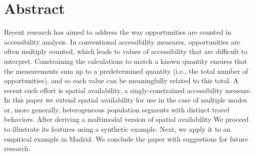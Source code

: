 \documentclass[10pt,letterpaper]{article}
\newcommand{\getIndex}[2]{
  \ForEach{,}{\IfEq{#1}{\thislevelitem}{\number\thislevelcount\ExitForEach}{}}{#2}
}
\newcommand{\getAff}[1]{
  \getIndex{#1}{McMaster,Madrid}
}
\begin{document}
\vspace*{0.2in}


\section*{Abstract}
Recent research has aimed to address the way opportunities are counted
in accessibility analysis. In conventional accessibility measures,
opportunities are often multiply counted, which leads to values of
accessibility that are difficult to interpret. Constraining the
calculations to match a known quantity ensures that the measurements sum
up to a predetermined quantity (i.e., the total number of
opportunities), and so each value can be meaningfully related to this
total. A recent such effort is spatial availability, a
singly-constrained accessibility measure. In this paper we extend
spatial availability for use in the case of multiple modes or, more
generally, heterogeneous population segments with distinct travel
behaviors. After deriving a multimodal version of spatial availability
We proceed to illustrate its features using a synthetic example. Next,
we apply it to an empirical example in Madrid. We conclude the paper
with suggestions for future research.
\end{document}
